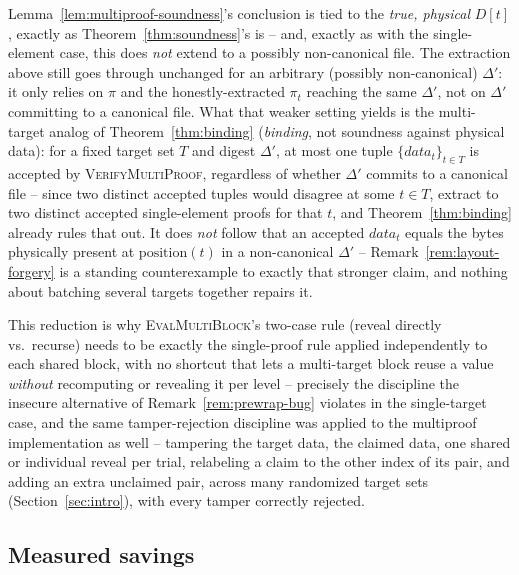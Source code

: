\begin{remark}
\label{rem:multiproof-scope}
Lemma~\ref{lem:multiproof-soundness}'s conclusion is tied to the
\emph{true, physical} $D[t]$, exactly as Theorem~\ref{thm:soundness}'s is
-- and, exactly as with the single-element case, this does \emph{not}
extend to a possibly non-canonical file. The extraction above still goes
through unchanged for an arbitrary (possibly non-canonical) $\Delta'$: it
only relies on $\pi$ and the honestly-extracted $\pi_t$ reaching the same
$\Delta'$, not on $\Delta'$ committing to a canonical file. What that
weaker setting yields is the multi-target analog of
Theorem~\ref{thm:binding} (\emph{binding}, not soundness against physical
data): for a fixed target set $T$ and digest $\Delta'$, at most one tuple
$\{\mathit{data}_t\}_{t\in T}$ is accepted by \textsc{VerifyMultiProof},
regardless of whether $\Delta'$ commits to a canonical file -- since two
distinct accepted tuples would disagree at some $t \in T$, extract to two
distinct accepted single-element proofs for that $t$, and
Theorem~\ref{thm:binding} already rules that out. It does \emph{not}
follow that an accepted $\mathit{data}_t$ equals the bytes physically
present at $\mathrm{position}(t)$ in a non-canonical $\Delta'$ --
Remark~\ref{rem:layout-forgery} is a standing counterexample to exactly
that stronger claim, and nothing about batching several targets together
repairs it.
\end{remark}

This reduction is why \textsc{EvalMultiBlock}'s two-case rule (reveal
directly vs.\ recurse) needs to be exactly the single-proof rule applied
independently to each shared block, with no shortcut that lets a
multi-target block reuse a value \emph{without} recomputing or revealing it
per level -- precisely the discipline the insecure alternative of
Remark~\ref{rem:prewrap-bug} violates in the single-target case, and the
same tamper-rejection discipline was applied to
the multiproof implementation as well -- tampering the target data, the
claimed data, one shared or individual reveal per trial, relabeling a
claim to the other index of its pair, and adding an extra unclaimed pair,
across many randomized target sets (Section~\ref{sec:intro}), with every
tamper correctly rejected.

\subsection{Measured savings}

